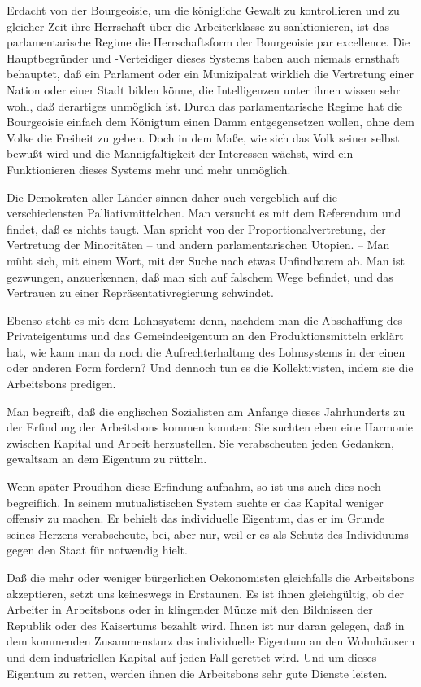 \documentclass{scrbook}
\begin{document}
Erdacht von der Bourgeoisie, um die königliche Gewalt zu kontrollieren und zu gleicher Zeit ihre Herrschaft über die Arbeiterklasse zu sanktionieren, ist das parlamentarische Regime die Herrschaftsform der Bourgeoisie par excellence. Die Hauptbegründer und -Verteidiger dieses Systems haben auch niemals ernsthaft behauptet, daß ein Parlament oder ein Munizipalrat wirklich die Vertretung einer Nation oder einer Stadt bilden könne, die Intelligenzen unter ihnen wissen sehr wohl, daß derartiges unmöglich ist. Durch das parlamentarische Regime hat die Bourgeoisie einfach dem Königtum einen Damm entgegensetzen wollen, ohne dem Volke die Freiheit zu geben. Doch in dem Maße, wie sich das Volk seiner selbst bewußt wird und die Mannigfaltigkeit der Interessen wächst, wird ein Funktionieren dieses Systems mehr und mehr unmöglich.

Die Demokraten aller Länder sinnen daher auch vergeblich auf die verschiedensten Palliativmittelchen. Man versucht es mit dem Referendum und findet, daß es nichts taugt. Man spricht von der Proportionalvertretung, der Vertretung der Minoritäten – und andern parlamentarischen Utopien. – Man müht sich, mit einem Wort, mit der Suche nach etwas Unfindbarem ab. Man ist gezwungen, anzuerkennen, daß man sich auf falschem Wege befindet, und das Vertrauen zu einer Repräsentativregierung schwindet.

Ebenso steht es mit dem Lohnsystem: denn, nachdem man die Abschaffung des Privateigentums und das Gemeindeeigentum an den Produktionsmitteln erklärt hat, wie kann man da noch die Aufrechterhaltung des Lohnsystems in der einen oder anderen Form fordern? Und dennoch tun es die Kollektivisten, indem sie die Arbeitsbons predigen.

Man begreift, daß die englischen Sozialisten am Anfange dieses Jahrhunderts zu der Erfindung der Arbeitsbons kommen konnten: Sie suchten eben eine Harmonie zwischen Kapital und Arbeit herzustellen. Sie verabscheuten jeden Gedanken, gewaltsam an dem Eigentum zu rütteln.

Wenn später Proudhon diese Erfindung aufnahm, so ist uns auch dies noch begreiflich. In seinem mutualistischen System suchte er das Kapital weniger offensiv zu machen. Er behielt das individuelle Eigentum, das er im Grunde seines Herzens verabscheute, bei, aber nur, weil er es als Schutz des Individuums gegen den Staat für notwendig hielt.

Daß die mehr oder weniger bürgerlichen Oekonomisten gleichfalls die Arbeitsbons akzeptieren, setzt uns keineswegs in Erstaunen. Es ist ihnen gleichgültig, ob der Arbeiter in Arbeitsbons oder in klingender Münze mit den Bildnissen der Republik oder des Kaisertums bezahlt wird. Ihnen ist nur daran gelegen, daß in dem kommenden Zusammensturz das individuelle Eigentum an den Wohnhäusern und dem industriellen Kapital auf jeden Fall gerettet wird. Und um dieses Eigentum zu retten, werden ihnen die Arbeitsbons sehr gute Dienste leisten.
\end{document}
